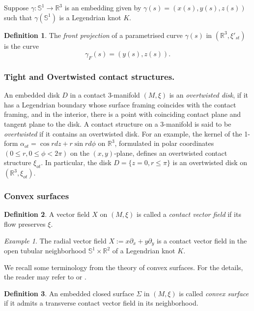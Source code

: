 \documentclass{amsart}
\theoremstyle{plain}
\theoremstyle{remark}
\newtheorem{exm}{Example}
\theoremstyle{definition}
\newtheorem{defn}{Definition}
\newcommand{\R}{\mathbb{R}}
\newcommand{\s}{\mathbb{S}}
\newcommand{\A}{\alpha}
\begin{document}
Suppose $\gamma: \s^1 \to \mathbb{R}^3$ is an embedding given by $\gamma(s)= (x(s), y(s), z(s))$ such that $\gamma(\s^1)$ is a Legendrian knot $K$.

\begin{defn}
    The {\it front projection} of a parametrised curve $\gamma(s)$ in $(\mathbb{R}^3, \xi'_{st})$ is the curve $$\gamma_F(s)= (y(s), z(s)).$$ 
\end{defn}

\subsubsection{Tight and Overtwisted contact structures.}
An embedded disk $D$ in a contact 3-manifold $(M,\xi)$ is an {\it overtwisted disk},  if it has a Legendrian boundary whose surface framing coincides with the contact framing, and in the interior, there is a point with coinciding contact plane and tangent plane to the disk. 
A contact structure on a 3-manifold is said to be {\it overtwisted} if it contains an overtwisted disk. 
For an example, the kernel of the 1-form $\A_{ot}= \cos r dz + r\sin r d\phi$ on $\R^3$, formulated in polar coordinates $(0\leq r, 0\leq \phi< 2\pi)$ on the $(x,y)$-plane, defines an overtwisted contact structure $\xi_{ot}$. 
In particular, the disk $D=\{z=0, r \leq \pi\}$ is an overtwisted disk on $(\R^3, \xi_{ot})$. 


\subsubsection{Convex surfaces}
\begin{defn}
    A vector field $X$ on $(M,\xi)$ is called a {\it contact vector field} if its flow preserves $\xi$. 
\end{defn}

\begin{exm}
    The radial vector field $X:= x\partial_x + y\partial_y$ is a contact vector field in the open tubular neighborhood $\s^1 \times \mathbb{R}^2$ of a Legendrian knot $K$.
\end{exm}

We recall some terminology from the theory of convex surfaces. 
For the details, the reader may refer to \cite{Book-HG} or \cite{Giroux-Convex91}. 

\begin{defn}
    An embedded closed surface $\Sigma$ in $(M,\xi)$ is called {\it convex surface} if it admits a transverse contact vector field in its neighborhood. 
\end{defn}
\end{document}

